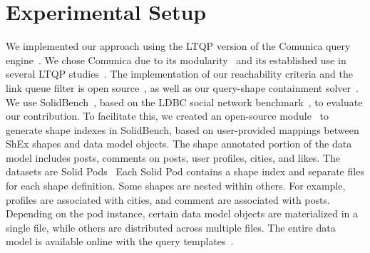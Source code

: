 \section{Experimental Setup}






We implemented our approach using the LTQP version of the Comunica query engine~\cite{taelman_iswc_resources_comunica_2018}.
We chose Comunica due to its modularity~\cite{taelman_swj_componentsjs_2022} and its established use in several LTQP studies~\cite{Bogaerts2021LinkTW, Taelman2023, eschauzier_quweda_linkqueue_2023, Hanski2024, eschauzier_amw_rcubemetric_2024, tam2024opportunitiesshapebasedoptimizationlink}.
The implementation of our reachability criteria and the link queue filter is open source~, as well as our query-shape containment solver~.
We use SolidBench~\cite{Taelman2023}, based on the LDBC social network benchmark~\cite{Angles2020}, to evaluate our contribution. 
To facilitate this, we created an open-source module~ to generate shape indexes in SolidBench, based on user-provided mappings between ShEx shapes and data model objects.
The shape annotated portion of the data model includes posts, comments on posts, user profiles, cities, and likes.
The datasets are Solid Pods~\cite{Taelman2023}
Each Solid Pod contains a shape index and separate files for each shape definition.
Some shapes are nested within others. 
For example, profiles are associated with cities, and comment are associated with posts.
Depending on the pod instance, certain data model objects are materialized in a single file, while others are distributed across multiple files.
The entire data model is available online with the query templates~.

